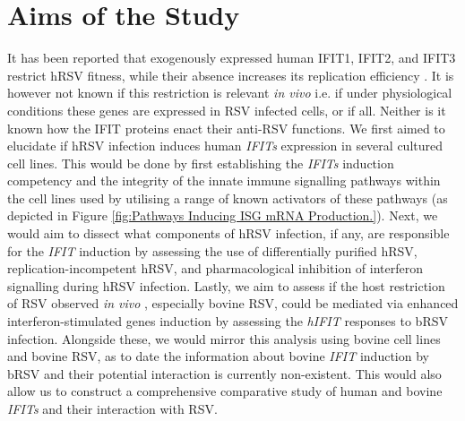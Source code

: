 \section{Aims of the Study} \label{sec:Aims}
It has been reported that exogenously expressed human IFIT1, IFIT2, and IFIT3 restrict hRSV fitness, while their absence increases its replication efficiency \cite{Drori2020InfluenzaProteins}. It is however not known if this restriction is relevant \textit{in vivo} i.e. if under physiological conditions these genes are expressed in RSV infected cells, or if all. Neither is it known how the IFIT proteins enact their anti-RSV functions. We first aimed to elucidate if hRSV infection induces human \textit{IFITs} expression in several cultured cell lines. This would be done by first establishing the \textit{IFITs} induction competency and the integrity of the innate immune signalling pathways within the cell lines used by utilising a range of known activators of these pathways (as depicted in Figure \ref{fig:Pathways Inducing ISG mRNA Production.}). Next, we would aim to dissect what components of hRSV infection, if any, are responsible for the \textit{IFIT} induction by assessing the use of differentially purified hRSV, replication-incompetent hRSV, and pharmacological inhibition of interferon signalling during hRSV infection. Lastly, we aim to assess if the host restriction of RSV observed \textit{in vivo} \cite{Nair2013GlobalAnalysis, Sacco2014RespiratoryCattle}, especially bovine RSV, could be mediated via enhanced interferon-stimulated genes induction by assessing the \textit{hIFIT} responses to bRSV infection. Alongside these, we would mirror this analysis using bovine cell lines and bovine RSV, as to date the information about bovine \textit{IFIT} induction by bRSV and their potential interaction is currently non-existent. This would also allow us to construct a comprehensive comparative study of human and bovine \textit{IFITs} and their interaction with RSV.

